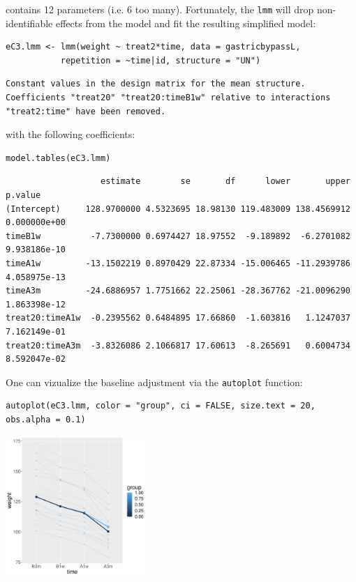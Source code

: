 \documentclass[12pt]{article}
\begin{document}
contains 12 parameters (i.e. 6 too many). Fortunately, the \texttt{lmm} will
 drop non-identifiable effects from the model and fit the resulting
 simplified model:
\lstset{language=r,label= ,caption= ,captionpos=b,numbers=none}
\begin{lstlisting}
eC3.lmm <- lmm(weight ~ treat2*time, data = gastricbypassL,
	       repetition = ~time|id, structure = "UN")
\end{lstlisting}

\begin{verbatim}
Constant values in the design matrix for the mean structure.
Coefficients "treat20" "treat20:timeB1w" relative to interactions "treat2:time" have been removed.
\end{verbatim}


with the following coefficients:
\lstset{language=r,label= ,caption= ,captionpos=b,numbers=none}
\begin{lstlisting}
model.tables(eC3.lmm)
\end{lstlisting}

\begin{verbatim}
                   estimate        se       df      lower       upper      p.value
(Intercept)     128.9700000 4.5323695 18.98130 119.483009 138.4569912 0.000000e+00
timeB1w          -7.7300000 0.6974427 18.97552  -9.189892  -6.2701082 9.938186e-10
timeA1w         -13.1502219 0.8970429 22.87334 -15.006465 -11.2939786 4.058975e-13
timeA3m         -24.6886957 1.7751662 22.25061 -28.367762 -21.0096290 1.863398e-12
treat20:timeA1w  -0.2395562 0.6484895 17.66860  -1.603816   1.1247037 7.162149e-01
treat20:timeA3m  -3.8326086 2.1066817 17.60613  -8.265691   0.6004734 8.592047e-02
\end{verbatim}


One can vizualize the baseline adjustment via the \texttt{autoplot} function:
\lstset{language=r,label= ,caption= ,captionpos=b,numbers=none}
\begin{lstlisting}
autoplot(eC3.lmm, color = "group", ci = FALSE, size.text = 20, obs.alpha = 0.1) 
\end{lstlisting}

\begin{center}
\includegraphics[width=0.4\textwidth]{./figures/gg-baseAdj.pdf}
\end{center}
\end{document}
